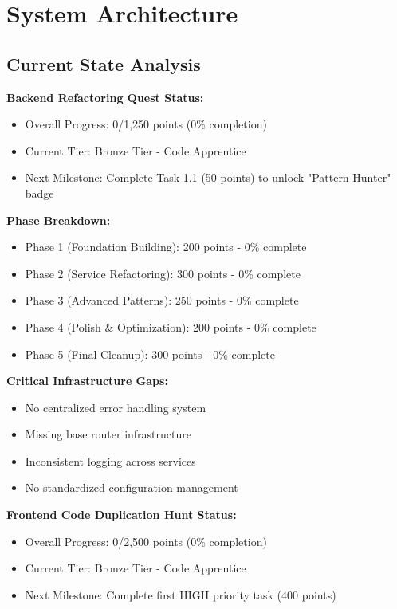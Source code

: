 \documentclass[10pt]{article}
\begin{document}
\section{System Architecture}

\subsection{Current State Analysis}

\textbf{Backend Refactoring Quest Status:}
\begin{itemize}
    \item Overall Progress: 0/1,250 points (0\% completion)
    \item Current Tier: Bronze Tier - Code Apprentice
    \item Next Milestone: Complete Task 1.1 (50 points) to unlock "Pattern Hunter" badge
\end{itemize}

\textbf{Phase Breakdown:}
\begin{itemize}
    \item Phase 1 (Foundation Building): 200 points - 0\% complete
    \item Phase 2 (Service Refactoring): 300 points - 0\% complete
    \item Phase 3 (Advanced Patterns): 250 points - 0\% complete
    \item Phase 4 (Polish \& Optimization): 200 points - 0\% complete
    \item Phase 5 (Final Cleanup): 300 points - 0\% complete
\end{itemize}

\textbf{Critical Infrastructure Gaps:}
\begin{itemize}
    \item No centralized error handling system
    \item Missing base router infrastructure
    \item Inconsistent logging across services
    \item No standardized configuration management
\end{itemize}

\textbf{Frontend Code Duplication Hunt Status:}
\begin{itemize}
    \item Overall Progress: 0/2,500 points (0\% completion)
    \item Current Tier: Bronze Tier - Code Apprentice
    \item Next Milestone: Complete first HIGH priority task (400 points)
\end{itemize}
\end{document}
